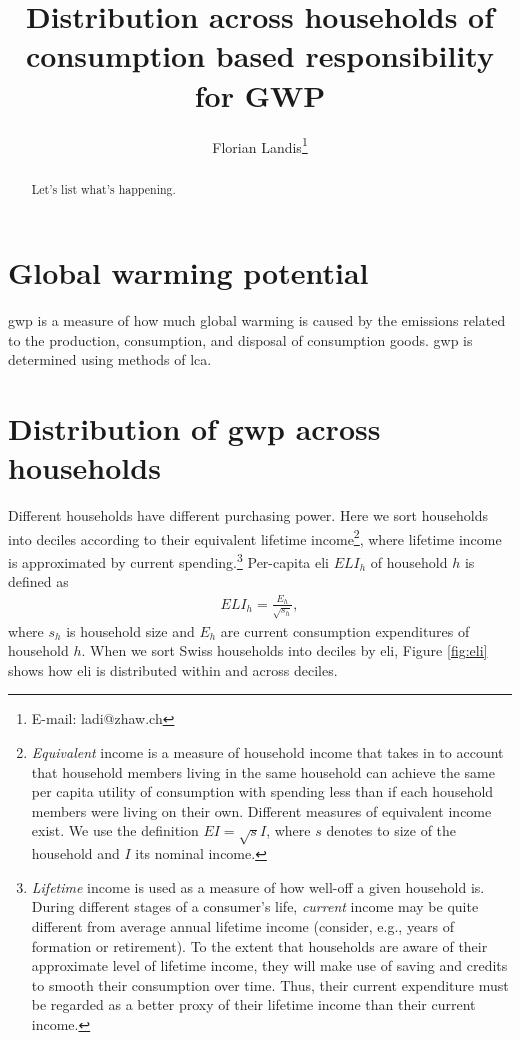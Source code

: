 \documentclass[a4paper,11pt]{article}
\author{Florian Landis\footnote{E-mail: ladi@zhaw.ch}}
\title{Distribution across households of consumption based responsibility for GWP}
\date{}
\begin{document}
\maketitle
\begin{abstract}
  Let's list what's happening.
\end{abstract}

\section{Global warming potential}
\label{sec:gwp}

\ac{gwp} is a measure of how much global warming is caused by the emissions related to the production, consumption, and disposal of consumption goods.
\ac{gwp} is determined using methods of \ac{lca}.

\section{Distribution of \ac{gwp} across households}
\label{sec:dist}

Different households have different purchasing power.
Here we sort households into deciles according to their equivalent lifetime income\footnote{
  \emph{Equivalent} income is a measure of household income that takes in to account that household members living in the same household can achieve the same per capita utility of consumption with spending less than if each household members were living on their own.
  Different measures of equivalent income exist.
  We use the definition $EI=\sqrt{s}I$, where $s$ denotes to size of the household and $I$ its nominal income.
}, where lifetime income is approximated by current spending.\footnote{
  \emph{Lifetime} income is used as a measure of how well-off a given household is.
  During different stages of a consumer's life, \emph{current} income may be quite different from average annual lifetime income (consider, e.g., years of formation or retirement).
  To the extent that households are aware of their approximate level of lifetime income, they will make use of saving and credits to smooth their consumption over time.
  Thus, their current expenditure must be regarded as a better proxy of their lifetime income than their current income.
}
Per-capita \acl{eli} $ELI_h$ of household $h$ is defined as
\begin{align*}
  ELI_h = \frac{E_h}{\sqrt{s_h}},
\end{align*}
where $s_h$ is household size and $E_h$ are current consumption expenditures of household $h$.
When we sort Swiss households into deciles by \ac{eli}, Figure \ref{fig:eli} shows how \ac{eli} is distributed within and across deciles.
\end{document}
